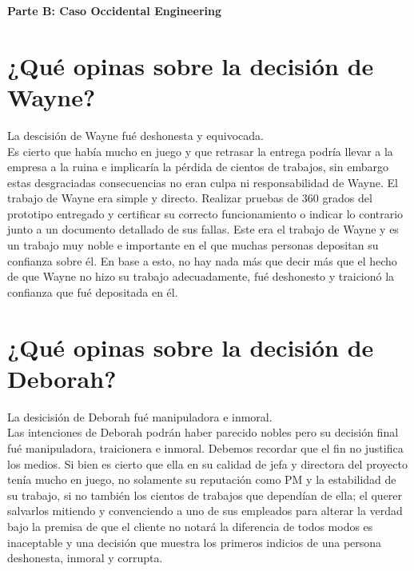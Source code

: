 \documentclass{article}
\newcommand*\rbreak{\par\noindent\linebreak}
\begin{document}
\clearpage\textbf{\huge{Parte B: Caso Occidental Engineering}}\rbreak
\section{¿Qué opinas sobre la decisión de Wayne?}
La descisión de Wayne fué deshonesta y equivocada. \\
Es cierto que había
mucho en juego y que retrasar la entrega podría llevar a la empresa
a la ruina e implicaría la pérdida de cientos de trabajos, sin 
embargo estas desgraciadas consecuencias no eran culpa ni 
responsabilidad de Wayne. El trabajo de Wayne era simple
y directo. Realizar pruebas de 360 grados del prototipo entregado y
certificar su correcto funcionamiento o indicar lo contrario junto a
un documento detallado de sus fallas. Este era el trabajo de Wayne
y es un trabajo muy noble e importante en el que muchas personas
depositan su confianza sobre él. En base a esto, no hay nada más 
que decir más que el hecho de que Wayne no hizo su trabajo 
adecuadamente, fué deshonesto y traicionó la confianza que
fué depositada en él.
\section{¿Qué opinas sobre la decisión de Deborah?}
La desicisión de Deborah fué manipuladora e inmoral. \\
Las intenciones de Deborah podrán haber parecido nobles pero 
su decisión final fué manipuladora, traicionera e inmoral. 
Debemos recordar que el fin no justifica los medios. Si bien
es cierto que ella en su calidad de jefa y directora del proyecto
tenía mucho en juego, no solamente su reputación como PM y la
estabilidad de su trabajo, si no también los cientos de trabajos
que dependían de ella; el querer salvarlos mitiendo y convenciendo
a uno de sus empleados para alterar la verdad bajo la premisa de 
que el cliente no notará la diferencia de todos modos es inaceptable
y una decisión que muestra los primeros indicios de una persona
deshonesta, inmoral y corrupta.
\end{document}
